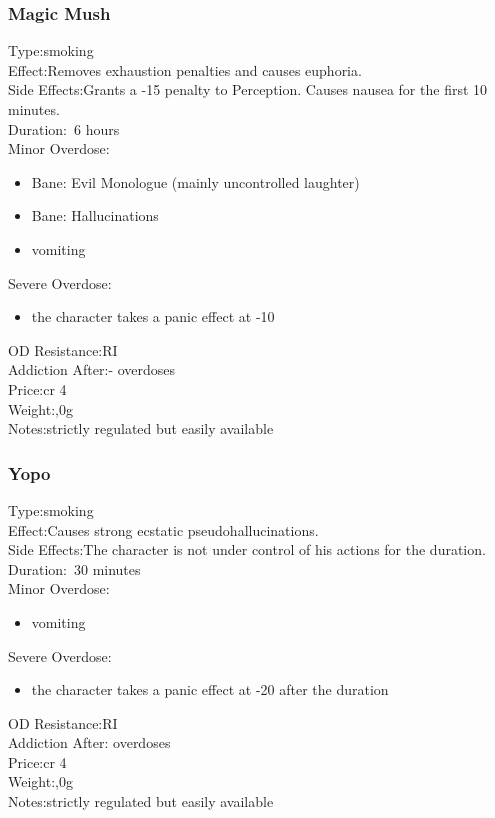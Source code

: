 \subsubsection{Magic Mush}
Type:\tab smoking\\
Effect:\tab Removes exhaustion penalties and causes euphoria.\\
Side Effects:\tab Grants a -15 penalty to Perception. Causes nausea for the first 10 minutes.\\
Duration:\tab ~6 hours\\
Minor Overdose:\\
\begin{itemize}
	\setlength\itemsep{-8mm}
	\vspace{-12mm}
	\item Bane: Evil Monologue (mainly uncontrolled laughter)
	\item Bane: Hallucinations
	\item vomiting
\end{itemize}
Severe Overdose:\\
\begin{itemize}
	\setlength\itemsep{-8mm}
	\vspace{-12mm}
	\item the character takes a panic effect at -10
\end{itemize}
OD Resistance:\tab RI\\
Addiction After:\tab - overdoses\\
Price:\tab cr 4\\
Weight:,0g\\
Notes:\tab strictly regulated but easily available


\subsubsection{Yopo}
Type:\tab smoking\\
Effect:\tab Causes strong ecstatic pseudohallucinations.\\
Side Effects:\tab The character is not under control of his actions for the duration.\\
Duration:\tab ~30 minutes\\
Minor Overdose:\\
\begin{itemize}
	\setlength\itemsep{-8mm}
	\vspace{-12mm}
	\item vomiting
\end{itemize}
Severe Overdose:\\
\begin{itemize}
	\setlength\itemsep{-8mm}
	\vspace{-12mm}
	\item the character takes a panic effect at -20 after the duration
\end{itemize}
OD Resistance:\tab RI\\
Addiction After: overdoses\\
Price:\tab cr 4\\
Weight:,0g\\
Notes:\tab strictly regulated but easily available


